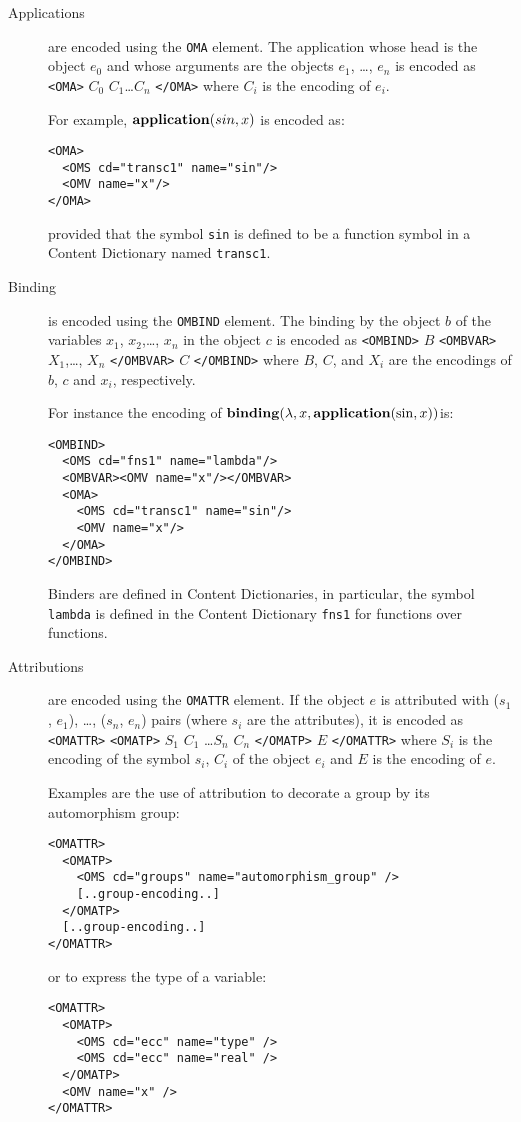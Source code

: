 \begin{description}
\item[Applications] are encoded using the \lstinline|OMA| element. The
  application whose head is the \OM object $e_0$ and whose arguments
  are the \OM objects $e_1$, \ldots, $e_n$ is encoded as \lstinline|<OMA>|
  $C_0$ $C_1$\ldots $C_n$ \lstinline|</OMA>| where $C_i$ is the encoding of
  $e_i$.


For example, $\mathbf{application}(sin,x)$ is encoded as:
\begin{lstlisting}
<OMA>  
  <OMS cd="transc1" name="sin"/> 
  <OMV name="x"/>  
</OMA>
\end{lstlisting}
  provided that the symbol \lstinline|sin| is defined to be a function
  symbol in a Content Dictionary named \lstinline|transc1|.
\item[Binding] is encoded using the \lstinline|OMBIND| element.  The binding by the \OM
  object $b$ of the \OM variables $x_1$, $x_2$,\ldots, $x_n$ in the object $c$ is encoded
  as \lstinline|<OMBIND>| $B$ \lstinline|<OMBVAR>| $X_1$,\ldots, $X_n$
  \lstinline|</OMBVAR>| $C$ \lstinline|</OMBIND>| where $B$, $C$, and $X_i$ are the
  encodings of $b$, $c$ and $x_i$, respectively.

  For instance the encoding of $\mathbf{binding}(\lambda,x,\mathbf{application}(\sin,x))$is:
\begin{lstlisting}
<OMBIND>
  <OMS cd="fns1" name="lambda"/>  
  <OMBVAR><OMV name="x"/></OMBVAR>  
  <OMA>
    <OMS cd="transc1" name="sin"/> 
    <OMV name="x"/>  
  </OMA>
</OMBIND>
\end{lstlisting}
  
Binders are defined in  Content Dictionaries, in particular,
  the symbol \lstinline|lambda| is defined in the Content Dictionary
  \lstinline|fns1| for functions over functions.
\item[Attributions] are encoded using the \lstinline|OMATTR| element.  If
  the \OM object $e$ is attributed with ($s_1$, $e_1$), \ldots, 
  ($s_n$, $e_n$) pairs (where $s_i$ are the attributes), it is encoded
  as \lstinline|<OMATTR>| \lstinline|<OMATP>| $S_1$ $C_1$ \ldots $S_n$ $C_n$ \lstinline|</OMATP>| $E$ \lstinline|</OMATTR>| where $S_i$ is the encoding of the
  symbol $s_i$, $C_i$ of the object $e_i$ and $E$ is the encoding of
  $e$.


Examples are the use of attribution to decorate a group by its
  automorphism group:
\begin{lstlisting}
<OMATTR>    
  <OMATP>
    <OMS cd="groups" name="automorphism_group" />  
    [..group-encoding..] 
  </OMATP>  
  [..group-encoding..] 
</OMATTR>
\end{lstlisting}
or to express the type of a variable:
\begin{lstlisting}
<OMATTR>    
  <OMATP>
    <OMS cd="ecc" name="type" /> 
    <OMS cd="ecc" name="real" />
  </OMATP> 
  <OMV name="x" />
</OMATTR>
\end{lstlisting}


\end{description}
